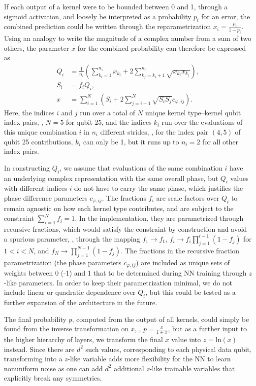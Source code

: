 If each output of a kernel were to be bounded between 0 and 1, through a sigmoid activation, and loosely be interpreted as a probability $p_i$ for an error, the combined prediction could be written through the reparametrization $x_i=\frac{p_i}{1-p_i}$. Using an analogy to write the magnitude of a complex number from a sum of two others, the parameter $x$ for the combined probability can therefore be expressed as
\begin{equation}
\begin{aligned}
Q_i &= \frac{1}{n_i}\left(\sum_{k_i=1}^{n_i} x_{k_i} + 2 \sum_{k_j=k_i+1}^{n_i} \sqrt{x_{k_i} x_{k_j}} \right), \\
S_i &= f_i Q_{i}, \\
x &= \sum_{i=1}^{N} \left( S_i + 2 \sum_{j=i+1}^{N} \sqrt{S_i S_j} c_{\varphi, ij} \right).
\end{aligned}
\label{eq:kernsum}
\end{equation}
Here, the indices $i$ and $j$ run over a total of $N$ unique kernel type--kernel qubit index pairs, \eg, $N=5$ for qubit 25, and the indices $k_i$ run over the evaluations of this unique combination $i$ in $n_i$ different strides, \eg, for the index pair $(4,5)$ of qubit 25 contributions, $k_i$ can only be 1, but it runs up to $n_i=2$ for all other index pairs.

In constructing $Q_i$, we assume that evaluations of the same combination $i$ have an underlying complex representation with the same overall phase, but $Q_i$ values with different indices $i$ do not have to carry the same phase, which justifies the phase difference parameters $c_{\varphi, ij}$.
The fractions $f_i$ are scale factors over $Q_i$ to remain agnostic on how each kernel type contributes, and are subject to the constraint $\sum_{i=1}^{N} f_i = 1$. In the implementation, they are parametrized through recursive fractions, which would satisfy the constraint by construction and avoid a spurious parameter, \ie, through the mapping $f_1 \to f_1$, $f_i \to f_i\prod_{j=1}^{i-1}\left(1-f_j\right)$ for $1<i<N$, and $f_N \to \prod_{j=1}^{N-1}\left(1-f_j\right)$. The fractions in the recursive fraction parametrization (the phase parameters $c_{\varphi, ij}$) are included as unique sets of weights between 0 (-1) and 1 that to be determined during NN training through $z$-like parameters. In order to keep their parametrization minimal, we do not include linear or quadratic dependence over $Q_i$, but this could be tested as a further expansion of the architecture in the future.

The final probability $p$, computed from the output of all kernels, could simply be found from the inverse transformation on $x$, \ie, $p=\frac{x}{1+x}$, but as a further input to the higher hierarchy of layers, we transform the final $x$ value into $z=\text{ln}(x)$ instead. Since there are $d^2$ such values, corresponding to each physical data qubit, transforming into a $z$-like variable adds more flexibility for the NN to learn nonuniform noise as one can add $d^2$ additional $z$-like trainable variables that explicitly break any symmetries.
